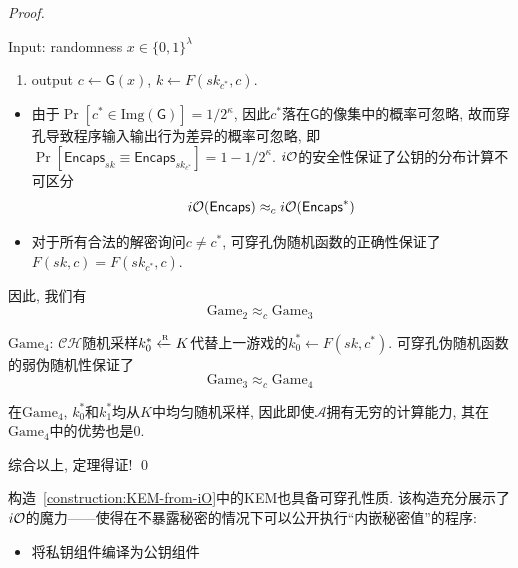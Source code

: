 \begin{proof}
\begin{trivlist}
\begin{framed}
\begin{minipage}[center]{\textwidth}
\begin{trivlist}
    \item Input: randomness $x \in \{0,1\}^\lambda$ 
        \begin{enumerate}\itemsep 1pt \parskip 0pt \parsep 0pt
            \item output $c \leftarrow \mathsf{G}(x)$, $k \leftarrow F(sk_{c^*}, c)$.
        \end{enumerate}
\end{trivlist}
\vspace{-1em}
\end{minipage}
\end{framed}

\begin{itemize}
\item 由于$\Pr[c^* \in \text{Img}(\mathsf{G})] = 1/2^\kappa$, 因此$c^*$落在$\mathsf{G}$的像集中的概率可忽略, 
    故而穿孔导致程序输入输出行为差异的概率可忽略, 即$\Pr[\mathsf{Encaps}_{sk} \equiv \mathsf{Encaps}_{sk_{c^*}}] = 1-1/2^\kappa$. 
    $i\mathcal{O}$的安全性保证了公钥的分布计算不可区分 
    \begin{equation*} 
        i\mathcal{O}(\mathsf{Encaps}) \approx_c i\mathcal{O}(\mathsf{Encaps}^*)
    \end{equation*}

    \item 对于所有合法的解密询问$c \neq c^*$, 可穿孔伪随机函数的正确性保证了$F(sk, c) = F(sk_{c^*}, c)$.  
\end{itemize}   
因此, 我们有
\begin{equation*}
    \text{Game}_2 \approx_c \text{Game}_3
\end{equation*}


\item $\text{Game}_4$: $\mathcal{CH}$随机采样$k_0^* \xleftarrow{\textup{\tiny R}} K$代替上一游戏的$k_0^* \leftarrow F(sk, c^*)$. 
    可穿孔伪随机函数的弱伪随机性保证了
\begin{equation*}
    \text{Game}_3 \approx_c \text{Game}_4
\end{equation*}

在$\text{Game}_4$, $k_0^*$和$k_1^*$均从$K$中均匀随机采样, 因此即使$\mathcal{A}$拥有无穷的计算能力, 其在$\text{Game}_4$中的优势也是0.
\end{trivlist}

综合以上, 定理得证! \qed 
\end{proof}

\begin{remark}
构造~\ref{construction:KEM-from-iO}中的KEM也具备可穿孔性质. 
该构造充分展示了$i\mathcal{O}$的魔力——使得在不暴露秘密的情况下可以公开执行``内嵌秘密值''的程序: 
\begin{itemize}
    \item 将私钥组件编译为公钥组件
\end{itemize} 
\end{remark}


